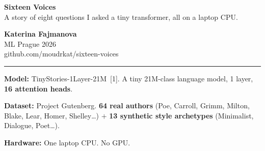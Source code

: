 \documentclass[a0,landscape]{a0poster}
\begin{document}
\thispagestyle{empty}
\noindent\begin{minipage}[t][\textheight][t]{\textwidth}

\begin{minipage}[b]{0.72\textwidth}
  \vspace{4mm}
  {\VeryHuge\bfseries Sixteen Voices}\\[8mm]
  {\huge\color{mutedText}A story of eight questions I asked a tiny transformer, all on a laptop CPU.}\\[4mm]
\end{minipage}%
\hfill
\begin{minipage}[b]{0.26\textwidth}\raggedleft
  {\Huge\bfseries Katerina Fajmanova}\\[3mm]
  {\LARGE ML Prague 2026}\\[1mm]
  {\Large\color{mutedText}github.com/moudrkat/sixteen-voices}
\end{minipage}

\vspace{3mm}
{\color{accBlack}\rule{\textwidth}{3pt}}
\vspace{4mm}

\noindent
\begin{tcolorbox}[enhanced, arc=4mm, colback=panelBg, colframe=panelBg, boxrule=0pt,
  left=6mm, right=6mm, top=3mm, bottom=3mm,
  borderline west={3mm}{0mm}{mutedText}]
  {\large
  \textbf{Model:} TinyStories-1Layer-21M~[1]. A tiny 21M-class language model, 1 layer, \textbf{16 attention heads}.\par\smallskip
  \textbf{Dataset:} Project Gutenberg. \textbf{64 real authors} (Poe, Carroll, Grimm, Milton, Blake, Lear, Homer, Shelley\ldots) $+$ \textbf{13 synthetic style archetypes} (Minimalist, Dialogue, Poet\ldots).\par\smallskip
  \textbf{Hardware:} One laptop CPU. No GPU.
  }
\end{tcolorbox}

\vspace{3mm}


\end{minipage}
\end{document}
